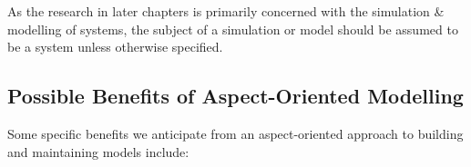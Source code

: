 As the research in later chapters is primarily concerned with the simulation \&
modelling of \sociotechnical systems, the subject of a simulation or model
should be assumed to be a \sociotechnical system unless otherwise specified.


\subsection{Possible Benefits of Aspect-Oriented Modelling}
Some specific benefits we anticipate from an aspect-oriented approach to
building and maintaining models include:


